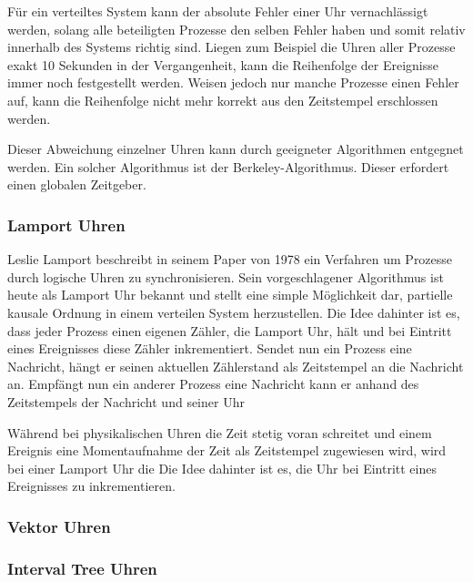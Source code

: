 Für ein verteiltes System kann der absolute Fehler einer Uhr vernachlässigt werden, solang alle beteiligten Prozesse den selben Fehler haben und somit relativ innerhalb des Systems richtig sind.
Liegen zum Beispiel die Uhren aller Prozesse exakt 10 Sekunden in der Vergangenheit, kann die Reihenfolge der Ereignisse immer noch festgestellt werden. Weisen jedoch nur manche Prozesse einen Fehler auf, kann die Reihenfolge nicht mehr korrekt aus den Zeitstempel erschlossen werden.

Dieser Abweichung einzelner Uhren kann durch geeigneter Algorithmen entgegnet werden.
Ein solcher Algorithmus ist der Berkeley-Algorithmus. Dieser erfordert einen globalen Zeitgeber.

\subsubsection{Lamport Uhren}
Leslie Lamport beschreibt in seinem Paper \cite{Lamport1978} von 1978 ein Verfahren um Prozesse durch logische Uhren zu synchronisieren.
Sein vorgeschlagener Algorithmus ist heute als Lamport Uhr bekannt und stellt eine simple Möglichkeit dar, partielle kausale Ordnung in einem verteilen System herzustellen.
Die Idee dahinter ist es, dass jeder Prozess einen eigenen Zähler, die Lamport Uhr, hält und bei Eintritt eines Ereignisses diese Zähler inkrementiert.
Sendet nun ein Prozess eine Nachricht, hängt er seinen aktuellen Zählerstand als Zeitstempel an die Nachricht an.
Empfängt nun ein anderer Prozess eine Nachricht kann er anhand des Zeitstempels der Nachricht und seiner Uhr 

Während bei physikalischen Uhren die Zeit stetig voran schreitet und einem Ereignis eine Momentaufnahme der Zeit als Zeitstempel zugewiesen wird, wird bei einer Lamport Uhr die
Die Idee dahinter ist es, die Uhr bei Eintritt eines Ereignisses zu inkrementieren.

\subsubsection{Vektor Uhren}
\subsubsection{Interval Tree Uhren}
